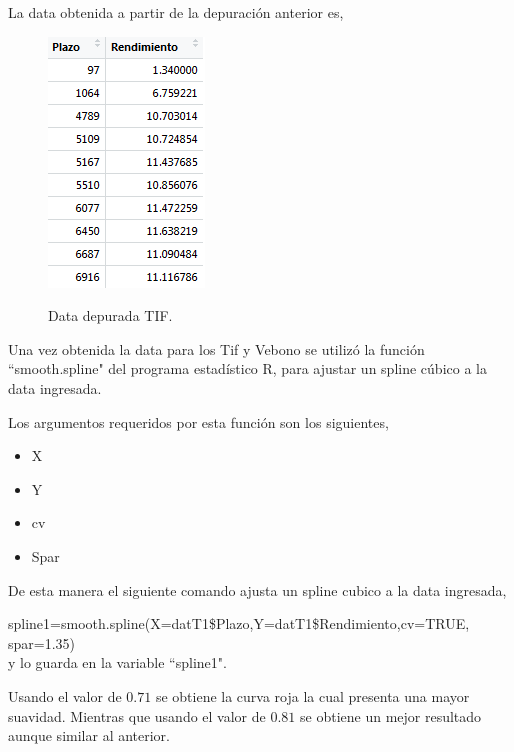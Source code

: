 \newpage

\hspace{0.4cm} La data obtenida a partir de la depuraci\'on anterior es,

\begin{figure}[h]
    {\includegraphics{images/cand.png}}
\caption{Data depurada TIF.}
\label{fig91}
\end{figure}



\hspace{0.4cm} Una vez obtenida la data para los Tif y Vebono se utiliz\'o la funci\'on ``smooth.spline" del programa estad\'istico R, para ajustar un spline c\'ubico a la data ingresada.


\hspace{0.4cm}  Los argumentos requeridos por esta funci\'on son los siguientes,

\begin{itemize}
 \item X
  \item Y
 \item cv
  \item Spar
\end{itemize}

\hspace{0.4cm} De esta manera el siguiente comando ajusta un spline cubico a la data ingresada,


spline1=smooth.spline(X=datT1\$Plazo,Y=datT1\$Rendimiento,cv=TRUE, spar=1.35)\\


\noindent y lo guarda en la variable ``spline1".

\hspace{0.4cm} Usando el valor de $0.71$ se obtiene la curva roja la cual presenta una mayor suavidad. Mientras que usando el valor de $0.81$ se obtiene un mejor resultado aunque similar al anterior.

